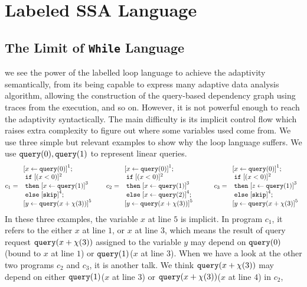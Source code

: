 \documentclass[a4paper,11pt]{article}
\begin{document}
\section{Labeled SSA Language}
%
{
\subsection{The Limit of {\tt While} Language}
we see the power of the labelled loop language to achieve the adaptivity semantically, from its being capable to express many adaptive data analysis algorithm,  allowing the construction of the query-based dependency graph using traces from the execution, and so on.
However, it is not powerful enough to reach the adaptivity syntactically. The main difficulty is its implicit control flow which raises extra complexity to figure out where some variables used come from. We use three simple but relevant examples to show why the loop language suffers. We use ${\tt query}(0),{\tt query}(1)$ to represent linear queries.
%
\[
 c_1 = \begin{array}{l}
      \clabel{ \assign{x}{\query(0)}}^{1} ; \\
      \eif  [(x < 0 )]^{2} \\
      \ethen \clabel{\assign{x}{\query(1)}}^{3}\\
      \eelse \clabel{\eskip}^{4} ; \\
      \clabel{\assign{y}{\query(x+\chi(3))}}^{5}
 \end{array}
 ~~~~~
 c_2 = \begin{array}{l}
      \clabel{ \assign{x}{\query(0)}}^{1} ; \\
      \eif  [(x < 0 )]^{2} \\
      \ethen \clabel{\assign{x}{\query(1)}}^{3}\\
      \eelse \clabel{\assign{x}{\query(2)}}^{4} ; \\
      \clabel{\assign{y}{\query(x+\chi(3))}}^{5}
 \end{array}
 ~~~~~~~~
  c_3 = \begin{array}{l}
      \clabel{ \assign{x}{\query(0)}}^{1} ; \\
      \eif  [(x < 0 )]^{2} \\
      \ethen \clabel{\assign{z}{\query(1)}}^{3}\\
      \eelse \clabel{\eskip}^{4} ; \\
      \clabel{\assign{y}{\query(x+\chi(3)}}^{5}
 \end{array}
\]
In these three examples, the variable $x$ at line $5$ is implicit. In program $c_1$, it refers to the either $x$ at line $1$, or $x$ at line $3$, which means the result of query request ${\tt query}(x+\chi(3))$ assigned to the variable $y$ may depend on ${\tt query}(0)$(bound to $x$ at line $1$) or ${\tt query}(1)$($x$ at line $3$). When we have a look at the other two programs $c_2$ and $c_3$, it is another talk. We think ${\tt query}(x+\chi(3))$ may depend on either ${\tt query}(1)$($x$ at line $3$) or ${\tt query}(x+\chi(3))$($x$ at line $4$) in $c_2$,     
}
\end{document}

